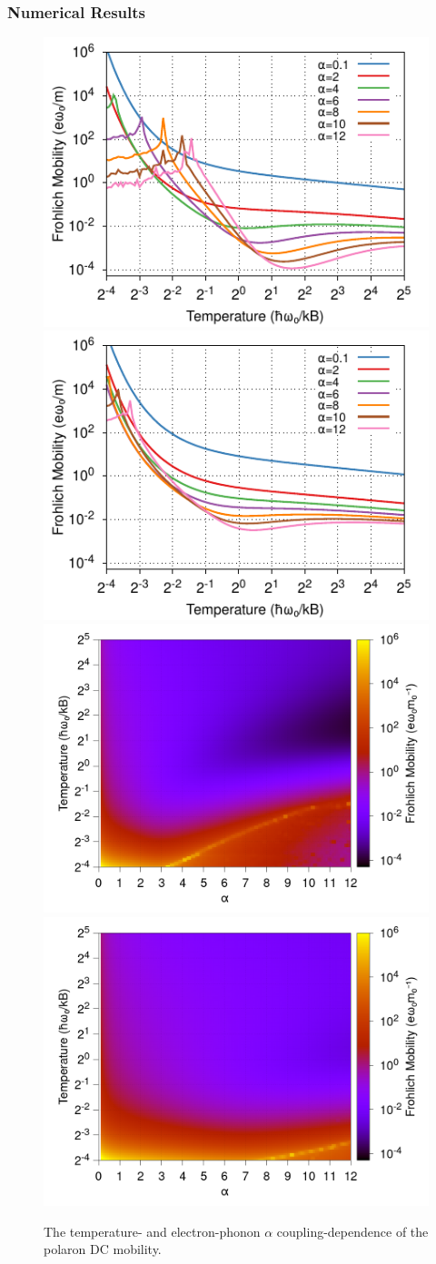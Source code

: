 \subsubsection{Numerical Results}

\begin{figure}[t]
    \centering
    \includegraphics[width=.49\textwidth]{chapters/background/figures/frohlich-2d-mobility-temp-00625to32-COLOUR.pdf}
    \includegraphics[width=.49\textwidth]{chapters/background/figures/frohlich-3d-mobility-temp-00625to32-COLOUR.pdf}
    \includegraphics[width=.49\textwidth]{chapters/background/figures/frohlich-2d-mobility-temp-00625to32-contourf.png}
    \includegraphics[width=.49\textwidth]{chapters/background/figures/frohlich-3d-mobility-temp-00625to32-contourf.png}
    \caption{The temperature- and electron-phonon $\alpha$ coupling-dependence of the polaron DC mobility.}
    \label{fig:dcmobility}
\end{figure}
\FloatBarrier  


